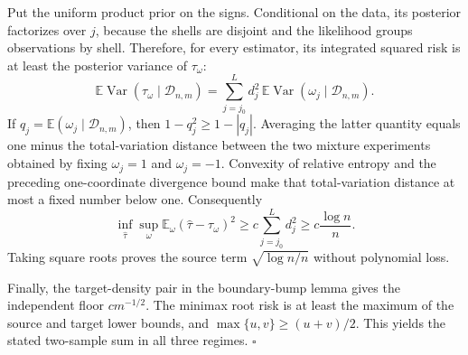 Put the uniform product prior on the signs.  Conditional on the data, its posterior factorizes over \(j\), because the shells are disjoint and the likelihood groups observations by shell.  Therefore, for every estimator, its integrated squared risk is at least the posterior variance of \(\tau_\omega\):
\[
 \mathbb E\operatorname{Var}(\tau_\omega\mid\mathcal D_{n,m})
 =\sum_{j=j_0}^L d_j^2\,
   \mathbb E\operatorname{Var}(\omega_j\mid\mathcal D_{n,m}).
\]
If \(q_j=\mathbb E(\omega_j\mid\mathcal D_{n,m})\), then \(1-q_j^2\ge1-|q_j|\).  Averaging the latter quantity equals one minus the total-variation distance between the two mixture experiments obtained by fixing \(\omega_j=1\) and \(\omega_j=-1\).  Convexity of relative entropy and the preceding one-coordinate divergence bound make that total-variation distance at most a fixed number below one.  Consequently
\[
 \inf_{\widehat\tau}\sup_\omega
 \mathbb E_\omega(\widehat\tau-\tau_\omega)^2
 \ge c\sum_{j=j_0}^Ld_j^2
 \ge c\frac{\log n}{n}.
\]
Taking square roots proves the source term \(\sqrt{\log n/n}\) without polynomial loss.

Finally, the target-density pair in the boundary-bump lemma gives the independent floor \(cm^{-1/2}\).  The minimax root risk is at least the maximum of the source and target lower bounds, and \(\max\{u,v\}\ge(u+v)/2\).  This yields the stated two-sample sum in all three regimes. \(\square\)